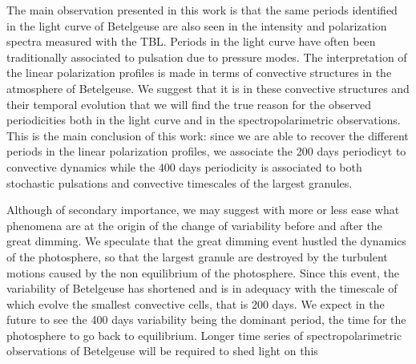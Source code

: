 \documentclass{aa}
\begin{document}
The main observation  presented in this work is that the same periods identified in the light curve of Betelgeuse are also seen in the intensity and polarization
spectra measured with the TBL. Periods in the light curve have often been traditionally associated to pulsation due to pressure modes.
The interpretation of the linear polarization profiles is made in terms of convective structures in the atmosphere of Betelgeuse. We suggest 
that it is in these convective structures and their temporal evolution that we will find the true reason for the observed periodicities both 
in the light curve and in the spectropolarimetric observations. This is the main conclusion of this work: since we are able to recover the different periods in the linear polarization profiles, we associate the 200 days periodicyt to convective dynamics while the 400 days periodicity is associated to both stochastic pulsations and convective timescales of the largest granules.%

Although of secondary importance, we may suggest with more or less ease what phenomena are at the origin of the change of variability before and after the great dimming. We speculate that the great dimming event hustled the dynamics of the photosphere, so that the largest granule are destroyed by the turbulent motions caused by the non equilibrium of the photosphere. Since this event, the variability of Betelgeuse has shortened and is in adequacy with the timescale of which evolve the smallest convective cells, that is 200 days. We expect in the future to see the 400 days variability being the dominant period, the time for the photosphere to go back to equilibrium. Longer time 
series of spectropolarimetric observations of Betelgeuse will be required to shed light on this
\end{document}
